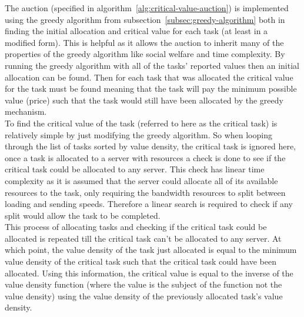 The auction (specified in algorithm~\ref{alg:critical-value-auction}) is implemented using the greedy algorithm from
subsection~\ref{subsec:greedy-algorithm} both in finding the initial allocation and critical value for each task (at
least in a modified form). This is helpful as it allows the auction to inherit many of the properties of the greedy
algorithm like social welfare and time complexity.
By running the greedy algorithm with all of the tasks' reported values then an initial allocation can be found. Then for
each task that was allocated the critical value for the task must be found meaning that the task will pay the minimum
possible value (price) such that the task would still have been allocated by the greedy mechanism. \\
To find the critical value of the task (referred to here as the critical task) is relatively simple by just modifying
the greedy algorithm. So when looping through the list of tasks sorted by value density, the critical task is ignored
here, once a task is allocated to a server with resources a check is done to see if the critical task could be
allocated to any server. This check has linear time complexity as it is assumed that the server could allocate all of
its available resources to the task, only requiring the bandwidth resources to split between loading and sending speeds.
Therefore a linear search is required to check if any split would allow the task to be completed. \\
This process of allocating tasks and checking if the critical task could be allocated is repeated till the critical
task can't be allocated to any server. At which point, the value density of the task just allocated is equal to the
minimum value density of the critical task such that the critical task could have been allocated. Using this
information, the critical value is equal to the inverse of the value density function (where the value is the subject
of the function not the value density) using the value density of the previously allocated task's value density.

